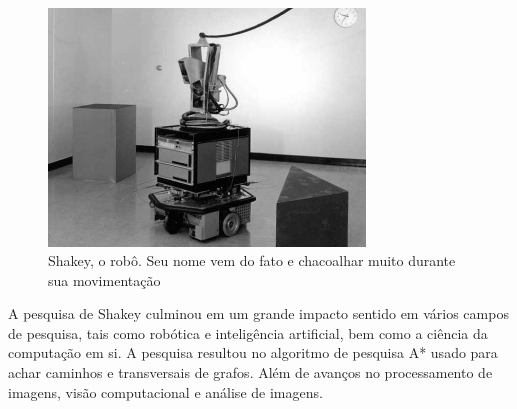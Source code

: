 \begin{figure}[H]
    \centering
    \includegraphics[width=0.75\textwidth]{figuras/shakey_robot.jpeg}
    \caption{Shakey, o robô. Seu nome vem do fato e chacoalhar muito durante sua movimentação}
    \label{fig:shakey:robo}
\end{figure}

A pesquisa de Shakey culminou em um grande impacto sentido em vários campos de pesquisa, tais como robótica e inteligência artificial, bem como a ciência da computação em si. A pesquisa resultou no algoritmo de pesquisa A* usado para achar caminhos e transversais de grafos. Além de avanços no processamento de imagens, visão computacional e análise de imagens\cite{cassel:2017}.

